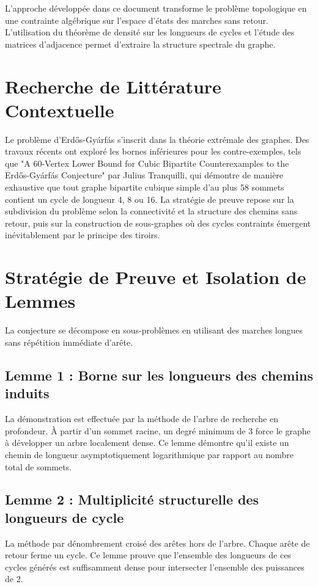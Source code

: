 \documentclass[12pt,a4paper]{article}
\begin{document}
L'approche d\'evelopp\'ee dans ce document transforme le probl\`eme topologique en une contrainte alg\'ebrique sur l'espace d'\'etats des marches sans retour. L'utilisation du th\'eor\`eme de densit\'e sur les longueurs de cycles et l'\'etude des matrices d'adjacence permet d'extraire la structure spectrale du graphe.

\section{Recherche de Litt\'erature Contextuelle}

Le probl\`eme d'Erd\H{o}s-Gy\'arf\'as s'inscrit dans la th\'eorie extr\'emale des graphes. Des travaux r\'ecents ont explor\'e les bornes inf\'erieures pour les contre-exemples, tels que "A 60-Vertex Lower Bound for Cubic Bipartite Counterexamples to the Erd\H{o}s-Gy\'arf\'as Conjecture" par Julius Tranquilli, qui d\'emontre de mani\`ere exhaustive que tout graphe bipartite cubique simple d'au plus 58 sommets contient un cycle de longueur 4, 8 ou 16. La strat\'egie de preuve repose sur la subdivision du probl\`eme selon la connectivit\'e et la structure des chemins sans retour, puis sur la construction de sous-graphes o\`u des cycles contraints \'emergent in\'evitablement par le principe des tiroirs.

\section{Strat\'egie de Preuve et Isolation de Lemmes}

La conjecture se d\'ecompose en sous-probl\`emes en utilisant des marches longues sans r\'ep\'etition imm\'ediate d'ar\^ete.

\subsection{Lemme 1 : Borne sur les longueurs des chemins induits}
La d\'emonstration est effectu\'ee par la m\'ethode de l'arbre de recherche en profondeur. \`A partir d'un sommet racine, un degr\'e minimum de 3 force le graphe \`a d\'evelopper un arbre localement dense. Ce lemme d\'emontre qu'il existe un chemin de longueur asymptotiquement logarithmique par rapport au nombre total de sommets.

\subsection{Lemme 2 : Multiplicit\'e structurelle des longueurs de cycle}
La m\'ethode par d\'enombrement crois\'e des ar\^etes hors de l'arbre. Chaque ar\^ete de retour ferme un cycle. Ce lemme prouve que l'ensemble des longueurs de ces cycles g\'en\'er\'es est suffisamment dense pour intersecter l'ensemble des puissances de 2.
\end{document}
